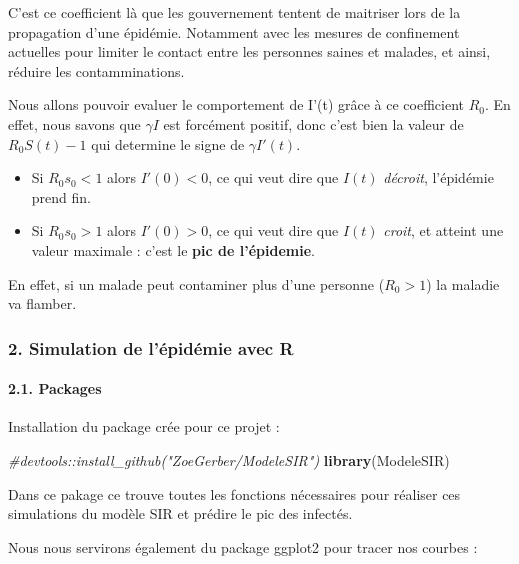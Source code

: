 \documentclass[
]{article}
\newenvironment{Shaded}{\begin{snugshade}}{\end{snugshade}}
\newcommand{\CommentTok}[1]{\textcolor[rgb]{0.56,0.35,0.01}{\textit{#1}}}
\newcommand{\KeywordTok}[1]{\textcolor[rgb]{0.13,0.29,0.53}{\textbf{#1}}}
\newcommand{\NormalTok}[1]{#1}
\providecommand{\tightlist}{%
  \setlength{\itemsep}{0pt}\setlength{\parskip}{0pt}}
\begin{document}
C'est ce coefficient là que les gouvernement tentent de maitriser lors
de la propagation d'une épidémie. Notamment avec les mesures de
confinement actuelles pour limiter le contact entre les personnes saines
et malades, et ainsi, réduire les contamminations.

Nous allons pouvoir evaluer le comportement de I'(t) grâce à ce
coefficient \(R_0\). En effet, nous savons que \(\gamma I\) est
forcément positif, donc c'est bien la valeur de \(R_0 S(t) - 1\) qui
determine le signe de \(\gamma I'(t)\).

\begin{itemize}
\tightlist
\item
  Si \(R_0 s_0 < 1\) alors \(I'(0) < 0\), ce qui veut dire que \(I(t)\)
  \emph{décroit}, l'épidémie prend fin.
\item
  Si \(R_0 s_0 > 1\) alors \(I'(0) > 0\), ce qui veut dire que \(I(t)\)
  \emph{croit}, et atteint une valeur maximale : c'est le \textbf{pic de
  l'épidemie}.
\end{itemize}

En effet, si un malade peut contaminer plus d'une personne (\(R_0 >1\))
la maladie va flamber.

\hypertarget{simulation-de-luxe9piduxe9mie-avec-r}{%
\subsubsection{2. Simulation de l'épidémie avec
R}\label{simulation-de-luxe9piduxe9mie-avec-r}}

\hypertarget{packages}{%
\paragraph{2.1. Packages}\label{packages}}

Installation du package crée pour ce projet :

\begin{Shaded}
\begin{Highlighting}[]
\CommentTok{#devtools::install_github("ZoeGerber/ModeleSIR")}
\KeywordTok{library}\NormalTok{(ModeleSIR)}
\end{Highlighting}
\end{Shaded}

Dans ce pakage ce trouve toutes les fonctions nécessaires pour réaliser
ces simulations du modèle SIR et prédire le pic des infectés.

Nous nous servirons également du package ggplot2 pour tracer nos courbes
:
\end{document}
